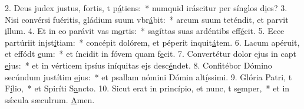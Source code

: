 2. Deus judex justus, fortis, t p\uline{á}tiens:~* numquid iráscitur per sínglos d\uline{i}es?
3. Nisi convérsi fuéritis, gládium suum vbr\uline{á}bit:~* arcum suum teténdit, et parvit \uline{i}llum.
4. Et in eo parávit vas m\uline{o}rtis:~* sagíttas suas ardéntibs eff\uline{é}cit.
5. Ecce partúriit injst\uline{í}tiam:~* concépit dolórem, et péperit inquit\uline{á}tem.
6. Lacum apéruit, et effódt \uline{e}um:~* et íncidit in fóvem quam f\uline{e}cit.
7. Convertétur dolor ejus in capt \uline{e}jus:~* et in vérticem ipsíus iníquitas ejs desc\uline{é}ndet.
8. Confitébor Dómino secúndum justítim \uline{e}jus:~* et psallam nómini Dómin alt\uline{í}ssimi.
9. Glória Patri, t F\uline{í}lio,~* et Spiríti S\uline{a}ncto.
10. Sicut erat in princípio, et nunc, t s\uline{e}mper,~* et in sǽcula sæculrum. \uline{A}men.
